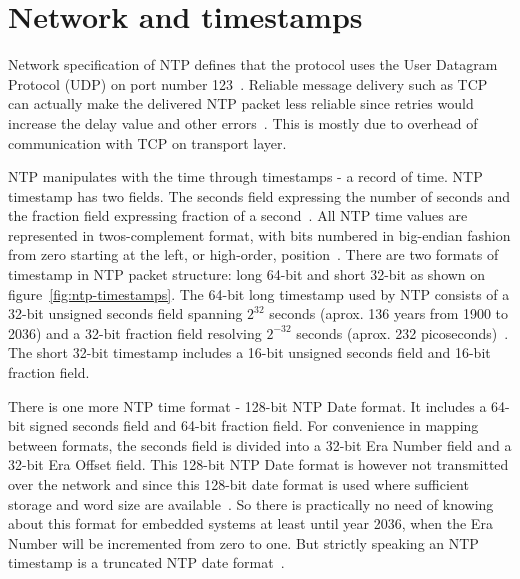 
\section{Network and timestamps}\label{sec:ntp-network}
Network specification of NTP defines that
the protocol uses the User Datagram Protocol (UDP) on port number 123~\cite{ianna-ports,rfc5905}.
Reliable message delivery such as TCP can actually make the delivered NTP packet less reliable since retries
would increase the delay value and other errors~\cite{rfc5905}.
This is mostly due to overhead of communication with TCP on transport layer.

NTP manipulates with the time through timestamps - a record of time.
NTP timestamp has two fields. The seconds field expressing the number of seconds
and the fraction field expressing fraction of a second~\cite{rfc5905}.
All NTP time values are represented in twos-complement format, with
bits numbered in big-endian fashion from zero starting at the left, or high-order, position~\cite{rfc5905}. 
There are two formats of timestamp in NTP packet structure:
long 64-bit and short 32-bit as shown on figure~\ref{fig:ntp-timestamps}.
The 64-bit long timestamp used by NTP consists of a 32-bit unsigned seconds
field spanning $2^{32}$ seconds (aprox. 136 years from 1900 to 2036) and a 32-bit fraction field resolving
$2^{-32}$ seconds (aprox. 232 picoseconds)~\cite{rfc5905}.
The short 32-bit timestamp includes a 16-bit unsigned seconds field
and 16-bit fraction field.

There is one more NTP time format - 128-bit NTP Date format.
It includes a 64-bit signed seconds field and 64-bit fraction field.
For convenience in mapping between formats,
the seconds field is divided into a 32-bit Era Number field
and a 32-bit Era Offset field.
This 128-bit NTP Date format is however not transmitted over the network
and since this 128-bit date format is used where sufficient storage and word
size are available~\cite{rfc5905}.
So there is practically no need of knowing about this format for embedded systems
at least until year 2036, when the Era Number will be incremented from zero to one.
But strictly speaking an NTP timestamp is a truncated NTP date format~\cite{rfc5905}.

